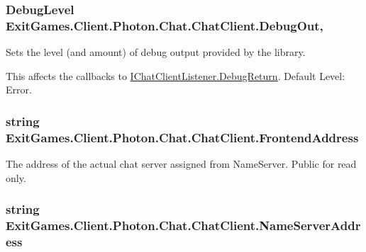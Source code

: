 \subsubsection[{\texorpdfstring{Debug\+Out}{DebugOut}}]{\setlength{\rightskip}{0pt plus 5cm}Debug\+Level Exit\+Games.\+Client.\+Photon.\+Chat.\+Chat\+Client.\+Debug\+Out\hspace{0.3cm}{\ttfamily [get]}, {\ttfamily [set]}}\hypertarget{class_exit_games_1_1_client_1_1_photon_1_1_chat_1_1_chat_client_a3506656c033fb2bdc7822275aab6dac2}{}\label{class_exit_games_1_1_client_1_1_photon_1_1_chat_1_1_chat_client_a3506656c033fb2bdc7822275aab6dac2}


Sets the level (and amount) of debug output provided by the library. 

This affects the callbacks to \hyperlink{interface_exit_games_1_1_client_1_1_photon_1_1_chat_1_1_i_chat_client_listener_ae4c3e779b7761f6a254231b9775fabcf}{I\+Chat\+Client\+Listener.\+Debug\+Return}. Default Level\+: Error. 
\subsubsection[{\texorpdfstring{Frontend\+Address}{FrontendAddress}}]{\setlength{\rightskip}{0pt plus 5cm}string Exit\+Games.\+Client.\+Photon.\+Chat.\+Chat\+Client.\+Frontend\+Address\hspace{0.3cm}{\ttfamily [get]}}\hypertarget{class_exit_games_1_1_client_1_1_photon_1_1_chat_1_1_chat_client_a4693102ef8b77518b9eed0cbbdd650e1}{}\label{class_exit_games_1_1_client_1_1_photon_1_1_chat_1_1_chat_client_a4693102ef8b77518b9eed0cbbdd650e1}


The address of the actual chat server assigned from Name\+Server. Public for read only.

\subsubsection[{\texorpdfstring{Name\+Server\+Address}{NameServerAddress}}]{\setlength{\rightskip}{0pt plus 5cm}string Exit\+Games.\+Client.\+Photon.\+Chat.\+Chat\+Client.\+Name\+Server\+Address\hspace{0.3cm}{\ttfamily [get]}}\hypertarget{class_exit_games_1_1_client_1_1_photon_1_1_chat_1_1_chat_client_afc6baf1a806a9a9ea803b14889ffb8c3}{}\label{class_exit_games_1_1_client_1_1_photon_1_1_chat_1_1_chat_client_afc6baf1a806a9a9ea803b14889ffb8c3}


